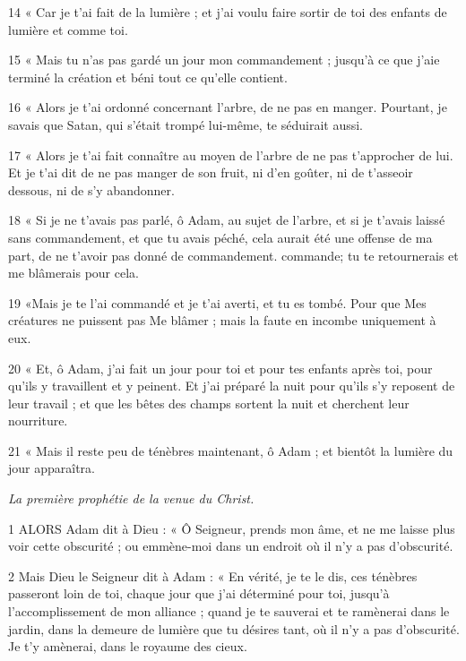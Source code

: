 \par 14 « Car je t'ai fait de la lumière ; et j’ai voulu faire sortir de toi des enfants de lumière et comme toi.

\par 15 « Mais tu n'as pas gardé un jour mon commandement ; jusqu'à ce que j'aie terminé la création et béni tout ce qu'elle contient.

\par 16 « Alors je t'ai ordonné concernant l'arbre, de ne pas en manger. Pourtant, je savais que Satan, qui s’était trompé lui-même, te séduirait aussi.

\par 17 « Alors je t'ai fait connaître au moyen de l'arbre de ne pas t'approcher de lui. Et je t'ai dit de ne pas manger de son fruit, ni d'en goûter, ni de t'asseoir dessous, ni de s'y abandonner.

\par 18 « Si je ne t'avais pas parlé, ô Adam, au sujet de l'arbre, et si je t'avais laissé sans commandement, et que tu avais péché, cela aurait été une offense de ma part, de ne t'avoir pas donné de commandement. commande; tu te retournerais et me blâmerais pour cela.

\par 19 «Mais je te l'ai commandé et je t'ai averti, et tu es tombé. Pour que Mes créatures ne puissent pas Me blâmer ; mais la faute en incombe uniquement à eux.

\par 20 « Et, ô Adam, j'ai fait un jour pour toi et pour tes enfants après toi, pour qu'ils y travaillent et y peinent. Et j'ai préparé la nuit pour qu'ils s'y reposent de leur travail ; et que les bêtes des champs sortent la nuit et cherchent leur nourriture.

\par 21 « Mais il reste peu de ténèbres maintenant, ô Adam ; et bientôt la lumière du jour apparaîtra.


\par \textit{La première prophétie de la venue du Christ.}

\par 1 ALORS Adam dit à Dieu : « Ô Seigneur, prends mon âme, et ne me laisse plus voir cette obscurité ; ou emmène-moi dans un endroit où il n'y a pas d'obscurité.

\par 2 Mais Dieu le Seigneur dit à Adam : « En vérité, je te le dis, ces ténèbres passeront loin de toi, chaque jour que j'ai déterminé pour toi, jusqu'à l'accomplissement de mon alliance ; quand je te sauverai et te ramènerai dans le jardin, dans la demeure de lumière que tu désires tant, où il n'y a pas d'obscurité. Je t’y amènerai, dans le royaume des cieux.

